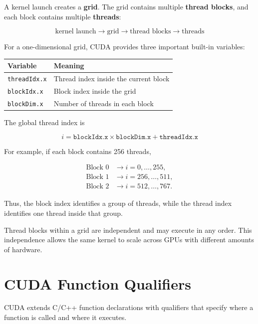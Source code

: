 \documentclass[11pt,a4paper]{article}
\begin{document}
A kernel launch creates a \textbf{grid}. The grid contains multiple \textbf{thread blocks}, and each block contains multiple \textbf{threads}:

\[
\boxed{
\text{kernel launch}
\rightarrow
\text{grid}
\rightarrow
\text{thread blocks}
\rightarrow
\text{threads}
}
\]

For a one-dimensional grid, CUDA provides three important built-in variables:

\begin{center}
\begin{tabular}{ll}
\toprule
Variable & Meaning \\
\midrule
\texttt{threadIdx.x} & Thread index inside the current block \\
\texttt{blockIdx.x} & Block index inside the grid \\
\texttt{blockDim.x} & Number of threads in each block \\
\bottomrule
\end{tabular}
\end{center}

The global thread index is

\[
\boxed{
i
=
\texttt{blockIdx.x}
\times
\texttt{blockDim.x}
+
\texttt{threadIdx.x}
}
\]

For example, if each block contains 256 threads,

\[
\begin{aligned}
\text{Block }0 &\rightarrow i=0,\ldots,255,\\
\text{Block }1 &\rightarrow i=256,\ldots,511,\\
\text{Block }2 &\rightarrow i=512,\ldots,767.
\end{aligned}
\]

Thus, the block index identifies a group of threads, while the thread index identifies one thread inside that group.

Thread blocks within a grid are independent and may execute in any order. This independence allows the same kernel to scale across GPUs with different amounts of hardware.

\section{CUDA Function Qualifiers}

CUDA extends C/C++ function declarations with qualifiers that specify where a function is called and where it executes.
\end{document}
